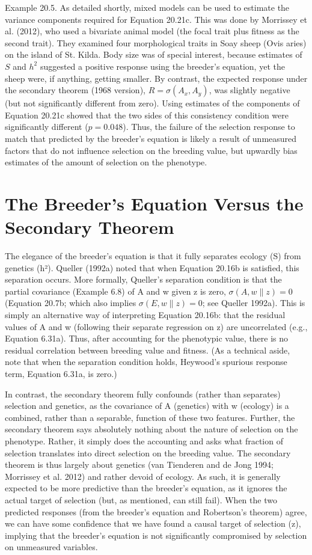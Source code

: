 \documentclass{article}
\begin{document}
Example 20.5. As detailed shortly, mixed models can be used to estimate the variance components required for Equation 20.21c. This was done by Morrissey et al. (2012), who used a bivariate animal model (the focal trait plus fitness as the second trait). They examined four morphological traits in Soay sheep (Ovis aries) on the island of St. Kilda. Body size was of special interest, because estimates of $S$ and $h^2$ suggested a positive response using the breeder's equation, yet the sheep were, if anything, getting smaller. By contrast, the expected response under the secondary theorem (1968 version), $R = \sigma(A_x, A_y)$, was slightly negative (but not significantly different from zero). Using estimates of the components of Equation 20.21c showed that the two sides of this consistency condition were significantly different ($p = 0.048$). Thus, the failure of the selection response to match that predicted by the breeder's equation is likely a result of unmeasured factors that do not influence selection on the breeding value, but upwardly bias estimates of the amount of selection on the phenotype.

\section{The Breeder’s Equation Versus the Secondary Theorem}
The elegance of the breeder’s equation is that it fully separates ecology (S) from genetics (h²). Queller (1992a) noted that when Equation 20.16b is satisfied, this separation occurs. More formally, Queller’s separation condition is that the partial covariance (Example 6.8) of A and w given z is zero,  $ \sigma(A, w \parallel z) = 0 $ (Equation 20.7b; which also implies  $ \sigma(E, w \parallel z) = 0 $; see Queller 1992a). This is simply an alternative way of interpreting Equation 20.16b: that the residual values of A and w (following their separate regression on z) are uncorrelated (e.g., Equation 6.31a). Thus, after accounting for the phenotypic value, there is no residual correlation between breeding value and fitness. (As a technical aside, note that when the separation condition holds, Heywood’s spurious response term, Equation 6.31a, is zero.)

In contrast, the secondary theorem fully confounds (rather than separates) selection and genetics, as the covariance of A (genetics) with w (ecology) is a combined, rather than a separable, function of these two features. Further, the secondary theorem says absolutely nothing about the nature of selection on the phenotype. Rather, it simply does the accounting and asks what fraction of selection translates into direct selection on the breeding value. The secondary theorem is thus largely about genetics (van Tienderen and de Jong 1994; Morrissey et al. 2012) and rather devoid of ecology. As such, it is generally expected to be more predictive than the breeder's equation, as it ignores the actual target of selection (but, as mentioned, can still fail). When the two predicted responses (from the breeder's equation and Robertson's theorem) agree, we can have some confidence that we have found a causal target of selection (z), implying that the breeder's equation is not significantly compromised by selection on unmeasured variables.
\end{document}
